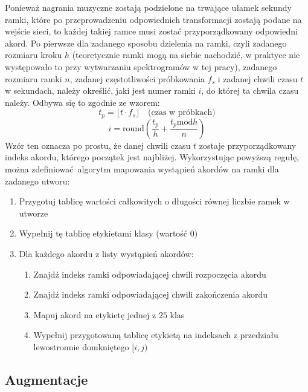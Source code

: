 Ponieważ nagrania muzyczne zostają podzielone na trwające ułamek sekundy ramki, które po przeprowadzeniu odpowiednich transformacji zostają podane na wejście sieci, to każdej takiej ramce musi zostać przyporządkowany odpowiedni akord. Po pierwsze dla zadanego sposobu dzielenia na ramki, czyli zadanego rozmiaru kroku $h$ (teoretycznie ramki mogą na siebie nachodzić, w praktyce nie występowało to przy wytwarzaniu spektrogramów w tej pracy), zadanego rozmiaru ramki $n$, zadanej częstotliwości próbkowania $f_s$ i zadanej chwili czasu $t$ w sekundach, należy określić, jaki jest numer ramki $i$, do której ta chwila czasu należy. Odbywa się to zgodnie ze wzorem:
\begin{equation}
    t_p = \lfloor t \cdot f_s \rfloor \quad \textrm{(czas w próbkach)}
\end{equation}
\begin{equation}
    i = \textrm{round}(\frac{t_p}{h} + \frac{t_p \textrm{mod} h}{n})
\end{equation}
Wzór ten oznacza po prostu, że danej chwili czasu $t$ zostaje przyporządkowany indeks akordu, którego początek jest najbliżej. Wykorzystując powyższą regułę, można zdefiniować algorytm mapowania wystąpień akordów na ramki dla zadanego utworu:
\begin{enumerate}
    \item Przygotuj tablicę wartości całkowitych o długości równej liczbie ramek w utworze
    \item Wypełnij tę tablicę etykietami klasy  (wartość $0$)
    \item Dla każdego akordu z listy wystąpień akordów:
        \begin{enumerate}
            \item Znajdź indeks  ramki odpowiadającej chwili rozpoczęcia akordu
            \item Znajdź indeks  ramki odpowiadającej chwili zakończenia akordu
            \item Mapuj akord na etykietę  jednej z $25$ klas
            \item Wypełnij przygotowaną tablicę etykietą  na indeksach z przedziału
                lewostronnie domkniętego $[i,j)$
        \end{enumerate}
\end{enumerate}

\subsection{Augmentacje}

